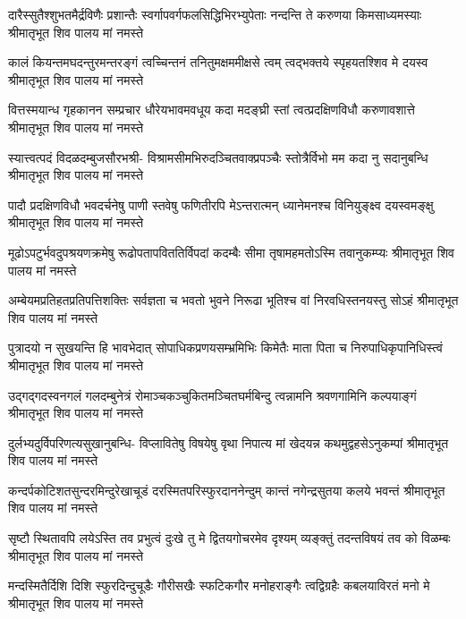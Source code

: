 \fourlineindentedshloka
{दारैस्सुतैश्शुभतमैर्द्रविणैः प्रशान्तैः}
{स्वर्गापवर्गफलसिद्धिभिरभ्युपेताः}
{नन्दन्ति ते करुणया किमसाध्यमस्याः}
{श्रीमातृभूत शिव पालय मां नमस्ते} %

\fourlineindentedshloka
{कालं कियन्तमघदन्तुरमन्तरङ्गं}
{त्वच्चिन्तनं तनितुमक्षममीक्षसे त्वम्}
{त्वद्भक्तये स्पृहयतश्शिव मे दयस्व}
{श्रीमातृभूत शिव पालय मां नमस्ते} %

\fourlineindentedshloka
{वित्तस्मयान्ध गृहकानन सम्प्रचार}
{धौरेयभावमवधूय कदा मदङ्घ्री}
{स्तां त्वत्प्रदक्षिणविधौ करुणावशात्ते}
{श्रीमातृभूत शिव पालय मां नमस्ते} %

\fourlineindentedshloka
{स्यात्त्वत्पदं विदळदम्बुजसौरभश्री-}
{विश्रामसीमभिरुदञ्चितवाक्प्रपञ्चैः}
{स्तोत्रैर्विभो मम कदा नु सदानुबन्धि}
{श्रीमातृभूत शिव पालय मां नमस्ते} %

\fourlineindentedshloka
{पादौ प्रदक्षिणविधौ भवदर्चनेषु पाणी}
{स्तवेषु फणितीरपि मेऽन्तरात्मन्}
{ध्यानेमनश्च विनियुङ्क्ष्व दयस्वमङ्क्षु}
{श्रीमातृभूत शिव पालय मां नमस्ते} %

\fourlineindentedshloka
{मूढोऽपटुर्भवदुपश्रयणक्रमेषु}
{रूढोपतापविततिर्विपदां कदम्बैः}
{सीमा तृषामहमतोऽस्मि तवानुकम्प्यः}
{श्रीमातृभूत शिव पालय मां नमस्ते} %

\fourlineindentedshloka
{अम्बेयमप्रतिहतप्रतिपत्तिशक्तिः}
{सर्वज्ञता च भवतो भुवने निरूढा}
{भूतिश्च वां निरवधिस्तनयस्तु सोऽहं}
{श्रीमातृभूत शिव पालय मां नमस्ते} %

\fourlineindentedshloka
{पुत्रादयो न सुखयन्ति हि भावभेदात्}
{सोपाधिकप्रणयसम्भ्रमिभिः किमेतैः}
{माता पिता च निरुपाधिकृपानिधिस्त्वं}
{श्रीमातृभूत शिव पालय मां नमस्ते} %

\fourlineindentedshloka
{उद्गद्गदस्वनगलं गलदम्बुनेत्रं}
{रोमाञ्चकञ्चुकितमञ्चितघर्मबिन्दु}
{त्वन्नामनि श्रवणगामिनि कल्पयाङ्गं}
{श्रीमातृभूत शिव पालय मां नमस्ते} %

\fourlineindentedshloka
{दुर्लभ्यदुर्विपरिणत्यसुखानुबन्धि-}
{विप्लावितेषु विषयेषु वृथा निपात्य}
{मां खेदयन्न कथमुद्वहसेऽनुकम्पां}
{श्रीमातृभूत शिव पालय मां नमस्ते} %

\fourlineindentedshloka
{कन्दर्पकोटिशतसुन्दरमिन्दुरेखाचूडं}
{दरस्मितपरिस्फुरदाननेन्दुम्}
{कान्तं नगेन्द्रसुतया कलये भवन्तं}
{श्रीमातृभूत शिव पालय मां नमस्ते} %

\fourlineindentedshloka
{सृष्टौ स्थितावपि लयेऽस्ति तव प्रभुत्वं}
{दुःखे तु मे द्वितयगोचरमेव दृश्यम्}
{व्यङ्क्तुं तदन्तविषयं तव को विळम्बः}
{श्रीमातृभूत शिव पालय मां नमस्ते} %

\fourlineindentedshloka
{मन्दस्मितैर्दिशि दिशि स्फुरदिन्दुचूडैः}
{गौरीसखैः स्फटिकगौर मनोहराङ्गैः}
{त्वद्विग्रहैः कबलयाविरतं मनो मे}
{श्रीमातृभूत शिव पालय मां नमस्ते} %


